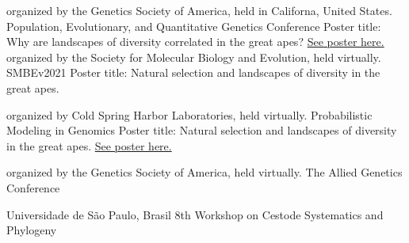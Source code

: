 		{%
			organized by the Genetics Society of America, held in Californa, United States.
        }
		{%
		    Population, Evolutionary, and Quantitative Genetics Conference
        }
		{%
        Poster title: Why are landscapes of diversity correlated in the great apes? \href{https://github.com/mufernando/peqg2022}{See poster here.}
        }
		{%
			organized by the Society for Molecular Biology and Evolution, held virtually.
        }
		{%
		    SMBEv2021
        }
		{%
        Poster title: Natural selection and landscapes of diversity in the great apes.
        }

		{%
			organized by Cold Spring Harbor Laboratories, held virtually.
        }
		{%
		    Probabilistic Modeling in Genomics
        }
		{%
        Poster title: Natural selection and landscapes of diversity in the great apes. \href{https://github.com/mufernando/probgen21}{See poster here.}
        }

		{%
			organized by the Genetics Society of America, held virtually.
        }
		{%
		    The Allied Genetics Conference
        }
		{%
        }

		{%
			Universidade de São Paulo, Brasil
        }
		{%
		    8th Workshop on Cestode Systematics and Phylogeny
        }
		{%
        }

